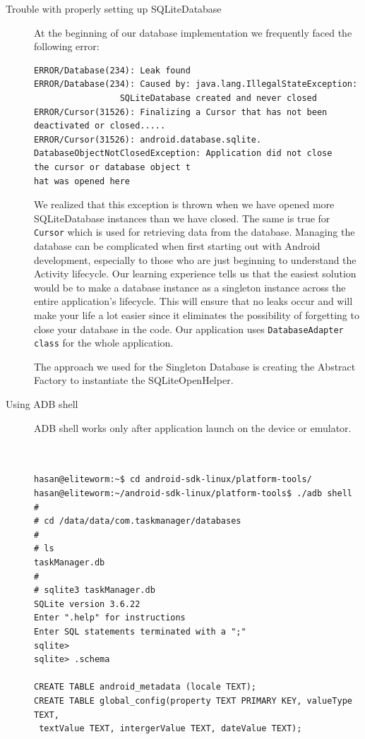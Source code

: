 \documentclass[10pt,a4paper]{report}
\begin{document}
  \begin{description}
  
  
  
\item[Trouble with properly setting up SQLiteDatabase] At the beginning of our database implementation we frequently faced the following error:

\begin{verbatim}
ERROR/Database(234): Leak found
ERROR/Database(234): Caused by: java.lang.IllegalStateException:
                 SQLiteDatabase created and never closed
ERROR/Cursor(31526): Finalizing a Cursor that has not been 
deactivated or closed.....
ERROR/Cursor(31526): android.database.sqlite.
DatabaseObjectNotClosedException: Application did not close 
the cursor or database object t
hat was opened here                  
\end{verbatim}

We realized that this exception is thrown when we have opened more SQLiteDatabase instances than we have closed. The same is true for \texttt{Cursor} which is used for retrieving data from the database. Managing the database can be complicated when first starting out with Android development, especially to those who are just beginning to understand the Activity lifecycle. Our learning experience tells us that the easiest solution would be to make a database instance as a singleton instance across the entire application's lifecycle. This will ensure that no leaks occur and will make your life a lot easier since it eliminates the possibility of forgetting to close your database in the code. Our application uses \texttt{DatabaseAdapter class} for the whole application.

The approach we used for the Singleton Database is creating the Abstract Factory to instantiate the SQLiteOpenHelper.

\item[Using ADB shell]  ADB shell works only after application launch on the device or emulator.
 
 \begin{verbatim}
 

hasan@eliteworm:~$ cd android-sdk-linux/platform-tools/
hasan@eliteworm:~/android-sdk-linux/platform-tools$ ./adb shell
# 
# cd /data/data/com.taskmanager/databases
#
# ls
taskManager.db
# 
# sqlite3 taskManager.db
SQLite version 3.6.22
Enter ".help" for instructions
Enter SQL statements terminated with a ";"
sqlite> 
sqlite> .schema

CREATE TABLE android_metadata (locale TEXT);
CREATE TABLE global_config(property TEXT PRIMARY KEY, valueType TEXT,
 textValue TEXT, intergerValue TEXT, dateValue TEXT);


\end{verbatim}
\end{description}
\end{document}

